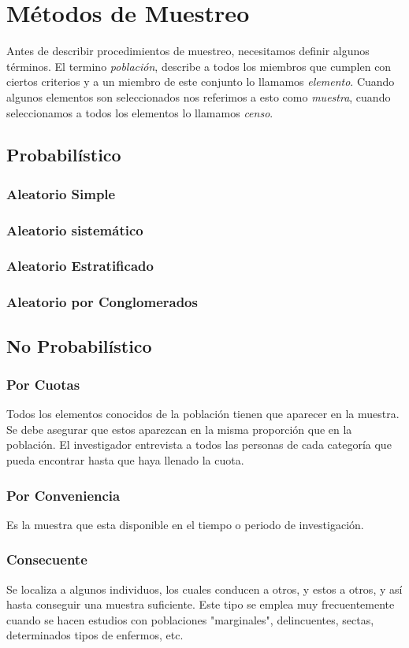 \documentclass[10pt,letterpaper]{article}
\begin{document}
\section{Métodos de Muestreo}
Antes de describir procedimientos de muestreo, necesitamos definir algunos términos. El termino \textit{población}, describe a todos los miembros que cumplen con ciertos criterios y a un miembro de este conjunto lo llamamos \textit{elemento}. Cuando algunos elementos son seleccionados nos referimos a esto como \textit{muestra}, cuando seleccionamos a todos los elementos lo llamamos \textit{censo}.
\subsection{Probabilístico}
\subsubsection{Aleatorio Simple}
\subsubsection{Aleatorio sistemático}
\subsubsection{Aleatorio Estratificado}
\subsubsection{Aleatorio por Conglomerados}
\subsection{No Probabilístico}
\subsubsection{Por Cuotas}
Todos los elementos conocidos de la población tienen que
aparecer en la muestra.
Se debe asegurar que estos aparezcan en la misma
proporción que en la población.
El investigador entrevista a todos las personas de cada
categoría que pueda encontrar hasta que haya llenado la
cuota.
\subsubsection{Por Conveniencia}
Es la muestra que esta disponible en el tiempo o periodo de
investigación.

\subsubsection{Consecuente}
Se localiza a algunos individuos, los cuales conducen a otros, y estos a otros, y así hasta
conseguir una muestra suficiente. Este tipo se emplea muy frecuentemente cuando se hacen
estudios con poblaciones "marginales", delincuentes, sectas, determinados tipos de enfermos, etc. 
\end{document}
